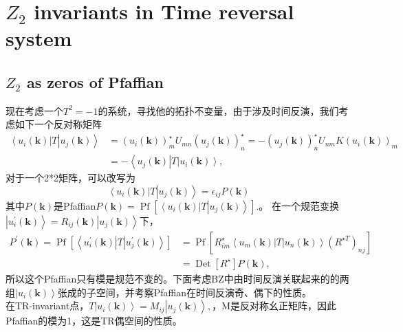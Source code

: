 \documentclass[10pt,openany]{book}
\theoremstyle{thmstyle} %
\theoremstyle{defstyle} %
\theoremstyle{prostyle} %
\begin{document}
\section{$Z_2$ invariants in Time reversal system}
\subsection{$Z_2$ as zeros of Pfaffian}
现在考虑一个$T^2=-1$的系统，寻找他的拓扑不变量，由于涉及时间反演，我们考虑如下一个反对称矩阵
\begin{equation}
  \begin{aligned}
    \left\langle u_i(\mathbf{k})\right| T\left|u_j(\mathbf{k})\right\rangle & =\left(u_i(\mathbf{k})\right)_m^{\star} U_{m n}\left(u_j(\mathbf{k})\right)_n^{\star}=-\left(u_j(\mathbf{k})\right)_n^{\star} U_{n m} K\left(u_i(\mathbf{k})\right)_m \\
    & =-\left\langle u_j(\mathbf{k})\right| T\left|u_i(\mathbf{k})\right\rangle,
    \end{aligned}
\end{equation}   
对于一个2*2矩阵，可以改写为
\begin{equation*}
  \left\langle u_i(\mathbf{k})\right| T\left|u_j(\mathbf{k})\right\rangle=\epsilon_{i j} P(\mathbf{k})
\end{equation*}  
其中$P(\mathbf{k})$是Pfaffian$P(\mathbf{k})=\operatorname{Pf}\left[\left\langle u_i(\mathbf{k})\right| T\left|u_j(\mathbf{k})\right\rangle\right] .$。
在一个规范变换$\left|u_i^{\prime}(\mathbf{k})\right\rangle=R_{i j}(\mathbf{k})\left|u_j(\mathbf{k})\right\rangle$下，
\begin{equation}
  \begin{aligned}
    P^{\prime}(\mathbf{k})=\operatorname{Pf}\left[\left\langle u_i^{\prime}(\mathbf{k})\right| T\left|u_j^{\prime}(\mathbf{k})\right\rangle\right] & =\operatorname{Pf}\left[R_{i m}^{\star}\left\langle u_m(\mathbf{k})\right| T\left|u_n(\mathbf{k})\right\rangle\left(R^{\star T}\right)_{n j}\right] \\
    & =\operatorname{Det}\left[R^{\star}\right] P(\mathbf{k}),
    \end{aligned}
\end{equation}
所以这个Pfaffian只有模是规范不变的。下面考虑BZ中由时间反演关联起来的的两组$\left|u_i(\mathbf{k})\right\rangle$张成的子空间，并考察Pfaffian在时间反演奇、偶下的性质。\\
在TR-invariant点，$T\left|u_i(\mathbf{k})\right\rangle=M_{i j}\left|u_j(\mathbf{k})\right\rangle,$，M是反对称幺正矩阵，因此Pfaffian的模为1，这是TR偶空间的性质。\\
\end{document}
